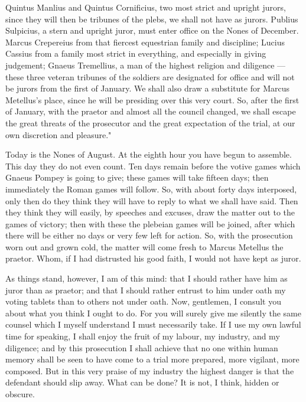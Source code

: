  Quintus Manlius and Quintus Cornificius, two most strict and upright jurors, since they will then be tribunes of the plebs, we shall not have as jurors. Publius Sulpicius, a stern and upright juror, must enter office on the Nones of December. Marcus Crepereius from that fiercest equestrian family and discipline; Lucius Cassius from a family most strict in everything, and especially in giving judgement; Gnaeus Tremellius, a man of the highest religion and diligence --- these three veteran tribunes of the soldiers are designated for office and will not be jurors from the first of January. We shall also draw a substitute for Marcus Metellus's place, since he will be presiding over this very court. So, after the first of January, with the praetor and almost all the council changed, we shall escape the great threats of the prosecutor and the great expectation of the trial, at our own discretion and pleasure."

 Today is the Nones of August. At the eighth hour you have begun to assemble. This day they do not even count. Ten days remain before the votive games which Gnaeus Pompey is going to give; these games will take fifteen days; then immediately the Roman games will follow. So, with about forty days interposed, only then do they think they will have to reply to what we shall have said. Then they think they will easily, by speeches and excuses, draw the matter out to the games of victory; then with these the plebeian games will be joined, after which there will be either no days or very few left for action. So, with the prosecution worn out and grown cold, the matter will come fresh to Marcus Metellus the praetor. Whom, if I had distrusted his good faith, I would not have kept as juror.

 As things stand, however, I am of this mind: that I should rather have him as juror than as praetor; and that I should rather entrust to him under oath my voting tablets than to others not under oath. Now, gentlemen, I consult you about what you think I ought to do. For you will surely give me silently the same counsel which I myself understand I must necessarily take. If I use my own lawful time for speaking, I shall enjoy the fruit of my labour, my industry, and my diligence; and by this prosecution I shall achieve that no one within human memory shall be seen to have come to a trial more prepared, more vigilant, more composed. But in this very praise of my industry the highest danger is that the defendant should slip away. What can be done? It is not, I think, hidden or obscure.

